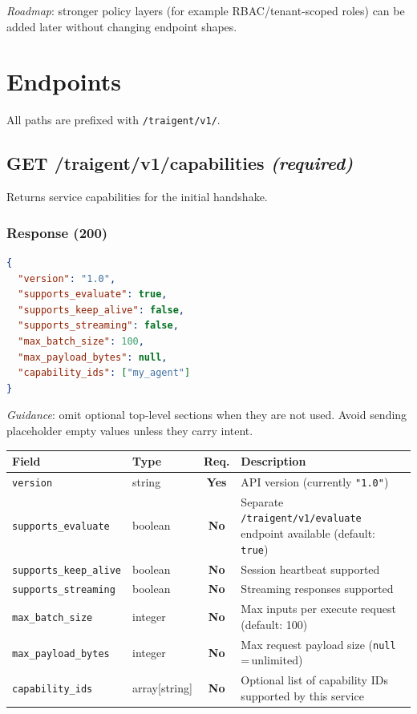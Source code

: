 \documentclass[11pt,a4paper]{article}
\newcommand{\field}[1]{\texttt{#1}}
\newcommand{\required}{\textbf{Yes}}
\newcommand{\optional}{\textbf{No}}
\newcommand{\status}[1]{\texttt{"#1"}}
\begin{document}
\textit{Roadmap}: stronger policy layers (for example RBAC/tenant-scoped roles)
can be added later without changing endpoint shapes.

\section{Endpoints}\label{sec:endpoints}

All paths are prefixed with \texttt{/traigent/v1/}.

\subsection{GET /traigent/v1/capabilities \normalfont\textit{(required)}}

Returns service capabilities for the initial handshake.

\subsubsection{Response (200)}

\begin{lstlisting}[language=json]
{
  "version": "1.0",
  "supports_evaluate": true,
  "supports_keep_alive": false,
  "supports_streaming": false,
  "max_batch_size": 100,
  "max_payload_bytes": null,
  "capability_ids": ["my_agent"]
}
\end{lstlisting}

\textit{Guidance}: omit optional top-level sections when they are not used.
Avoid sending placeholder empty values unless they carry intent.

\begin{center}\small
\begin{tabularx}{\textwidth}{@{}llcX@{}}
\toprule
\textbf{Field} & \textbf{Type} & \textbf{Req.} & \textbf{Description} \\
\midrule
\field{version}              & string  & \required & API version (currently \status{1.0}) \\
\field{supports\_evaluate}   & boolean & \optional & Separate \texttt{/traigent/v1/evaluate} endpoint available (default: \texttt{true}) \\
\field{supports\_keep\_alive}& boolean & \optional & Session heartbeat supported \\
\field{supports\_streaming}  & boolean & \optional & Streaming responses supported \\
\field{max\_batch\_size}     & integer & \optional & Max inputs per execute request (default: 100) \\
\field{max\_payload\_bytes}  & integer & \optional & Max request payload size (\texttt{null}\,=\,unlimited) \\
\field{capability\_ids}      & array[string] & \optional & Optional list of capability IDs supported by this service \\
\bottomrule
\end{tabularx}
\end{center}
\end{document}
